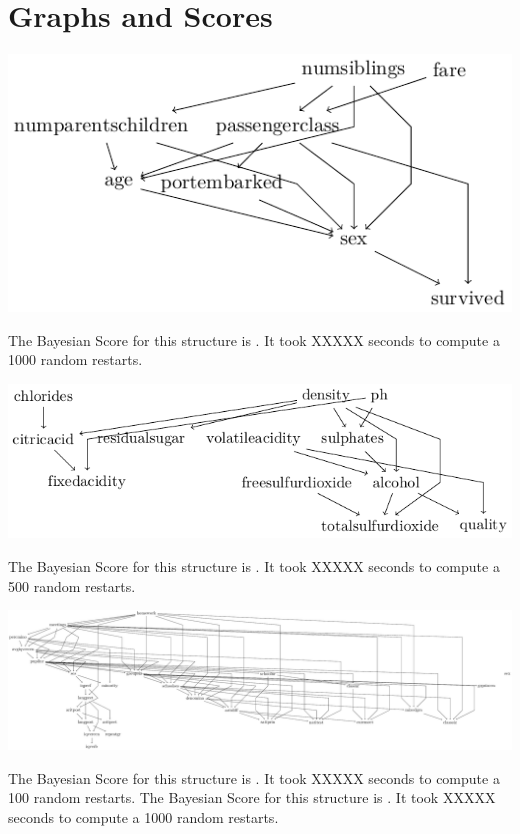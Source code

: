 \documentclass[12pt, oneside]{article}
\begin{document}
\section{Graphs and Scores}
  \begin{center}
    \includegraphics[scale=0.8]{titanic.pdf}
  \end{center}
  The Bayesian Score for this structure is .
  It took XXXXX seconds to compute a 1000 random restarts.
  \begin{center}
    \includegraphics[scale=0.8]{whitewine.pdf}
  \end{center}
  The Bayesian Score for this structure is .
  It took XXXXX seconds to compute a 500 random restarts.
  \begin{center}
    \includegraphics[scale=0.4]{schoolgrades.pdf}
  \end{center}
  The Bayesian Score for this structure is .
  It took XXXXX seconds to compute a 100 random restarts.
  The Bayesian Score for this structure is .
  It took XXXXX seconds to compute a 1000 random restarts.

  
  
\end{document}
